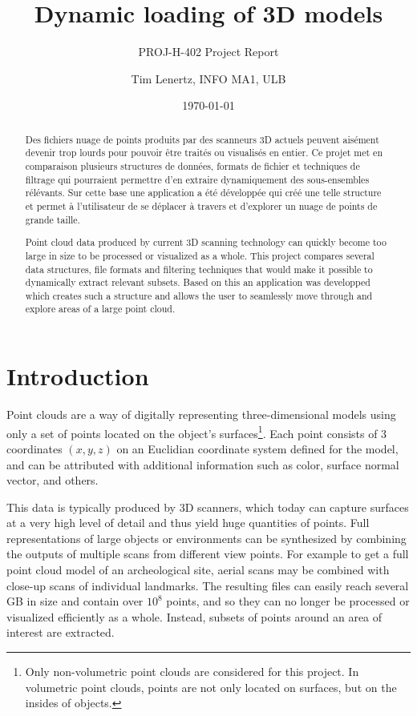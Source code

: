 \documentclass[a4paper,10pt,abstracton,notitlepage]{scrreprt}
\title{Dynamic loading of 3D models}
\subtitle{PROJ-H-402 Project Report}
\author{Tim Lenertz, INFO MA1, ULB}
\date{\today}
\begin{document}
\maketitle{}

\vspace{3cm}
\renewcommand{\abstractname}{Résumé}
\begin{abstract}
Des fichiers nuage de points produits par des scanneurs 3D actuels peuvent aisément devenir trop lourds pour pouvoir être traités ou visualisés en entier. Ce projet met en comparaison plusieurs structures de données, formats de fichier et techniques de filtrage qui pourraient permettre d'en extraire dynamiquement des sous-ensembles rélévants. Sur cette base une application a été développée qui créé une telle structure et permet à l'utilisateur de se déplacer à travers et d'explorer un nuage de points de grande taille.
\end{abstract}

\vspace{2cm}
\renewcommand{\abstractname}{Abstract}
\begin{abstract}
Point cloud data produced by current 3D scanning technology can quickly become too large in size to be processed or visualized as a whole. This project compares several data structures, file formats and filtering techniques that would make it possible to dynamically extract relevant subsets. Based on this an application was developped which creates such a structure and allows the user to seamlessly move through and explore areas of a large point cloud. 
\end{abstract}

\tableofcontents{}

\chapter{Introduction}
Point clouds are a way of digitally representing three-dimensional models using only a set of points located on the object's surfaces\footnote{Only non-volumetric point clouds are considered for this project. In volumetric point clouds, points are not only located on surfaces, but on the insides of objects.}. Each point consists of 3 coordinates $(x, y, z)$ on an Euclidian coordinate system defined for the model, and can be attributed with additional information such as color, surface normal vector, and others.

This data is typically produced by 3D scanners, which today can capture surfaces at a very high level of detail and thus yield huge quantities of points. Full representations of large objects or environments can be synthesized by combining the outputs of multiple scans from different view points. For example to get a full point cloud model of an archeological site, aerial scans may be combined with close-up scans of individual landmarks. The resulting files can easily reach several GB in size and contain over $10^{8}$ points, and so they can no longer be processed or visualized efficiently as a whole. Instead, subsets of points around an area of interest are extracted.
\end{document}
